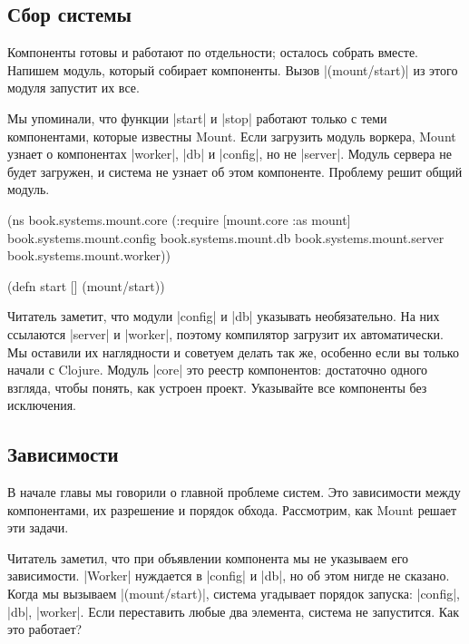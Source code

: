 \subsection{Сбор системы}

Компоненты готовы и работают по отдельности; осталось собрать вместе. Напишем
модуль, который собирает компоненты. Вызов \spverb|(mount/start)| из этого
модуля запустит их все.

Мы упоминали, что функции \spverb|start| и \spverb|stop| работают только с теми
компонентами, которые известны Mount. Если загрузить модуль воркера, Mount
узнает о компонентах \spverb|worker|, \spverb|db| и \spverb|config|, но не
\spverb|server|. Модуль сервера не будет загружен, и система не узнает об этом
компоненте. Проблему решит общий модуль.

\begin{english}
  \begin{clojure}
(ns book.systems.mount.core
  (:require
   [mount.core :as mount]
   book.systems.mount.config
   book.systems.mount.db
   book.systems.mount.server
   book.systems.mount.worker))

(defn start []
  (mount/start))
  \end{clojure}
\end{english}

Читатель заметит, что модули \spverb|config| и \spverb|db| указывать
необязательно. На них ссылаются \spverb|server| и \spverb|worker|, поэтому
компилятор загрузит их автоматически. Мы оставили их наглядности и советуем
делать так же, особенно если вы только начали с Clojure. Модуль \spverb|core|
это реестр компонентов: достаточно одного взгляда, чтобы понять, как устроен
проект. Указывайте все компоненты без исключения.


\subsection{Зависимости}

В начале главы мы говорили о главной проблеме систем. Это зависимости между
компонентами, их разрешение и порядок обхода. Рассмотрим, как Mount
решает эти задачи.

Читатель заметил, что при объявлении компонента мы не указываем его
зависимости. \spverb|Worker| нуждается в \spverb|config| и \spverb|db|, но об
этом нигде не сказано. Когда мы вызываем \spverb|(mount/start)|, система
угадывает порядок запуска: \spverb|config|, \spverb|db|, \spverb|worker|. Если
переставить любые два элемента, система не запустится. Как это работает?

